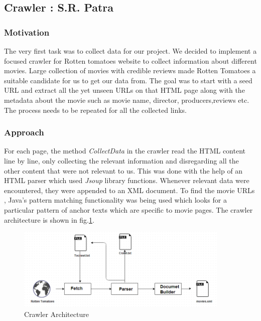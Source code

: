 \subsection{Crawler : S.R. Patra}
\subsubsection{Motivation}
The very first task was to collect data for our project. We decided to implement a focused crawler\cite{2ii35} for Rotten tomatoes website to collect information about different movies. Large collection of movies with credible reviews made Rotten Tomatoes a suitable candidate for us to get our data from. The goal was to start with a seed URL and extract all the yet unseen URLs on that HTML page along with the metadata about the movie such as movie name, director, producers,reviews etc. The process needs to be repeated for all the collected links.
\subsubsection{Approach}
For each page, the method \textit{CollectData} in the crawler read the HTML content line by line, only collecting the relevant information and disregarding all the other content that were not relevant to us. This was done with the help of an HTML parser which used \textit{Jsoup} library functions. Whenever relevant data were encountered, they were appended to an XML document. To find the movie URLs , Java's pattern matching functionality was being used which looks for a particular pattern of anchor texts which are specific to movie pages. The crawler architecture is shown in fig.\ref{fig:architecture}.

\begin{figure}[H]
    \centering
    \includegraphics[width=4.0in]{crawler_arch.png}
    \caption{Crawler Architecture}
    \label{fig:architecture}
\end{figure}

